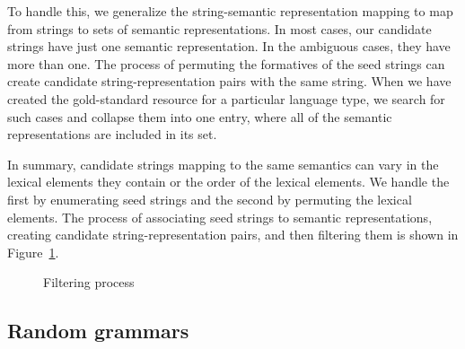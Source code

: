 \documentclass[11pt]{article}
\begin{document}

%
To handle this, we generalize the string-semantic representation mapping
to map from strings to sets of semantic representations.  In most cases,
our candidate strings have just one semantic representation.  In the
ambiguous cases, they have more than one.  The process of permuting
the formatives of the seed strings can create candidate string-representation
pairs with the same string.  When we have created the gold-standard resource
for a particular language type, we search for such cases and collapse them
into one entry, where all of the semantic representations are included in
its set.

In summary, candidate strings mapping to the same semantics can vary
in the lexical elements they contain or the order of the lexical
elements.  We handle the first by enumerating seed strings and the
second by permuting the lexical elements.  The process of associating
seed strings to semantic representations, creating candidate
string-representation pairs, and then filtering them is shown in
Figure~\ref{filter_fig}.

\begin{figure}[ht]
\begin{center}
\end{center}
\caption{Filtering process}
\label{filter_fig}
\end{figure}

\subsection{Random grammars}
\end{document}
